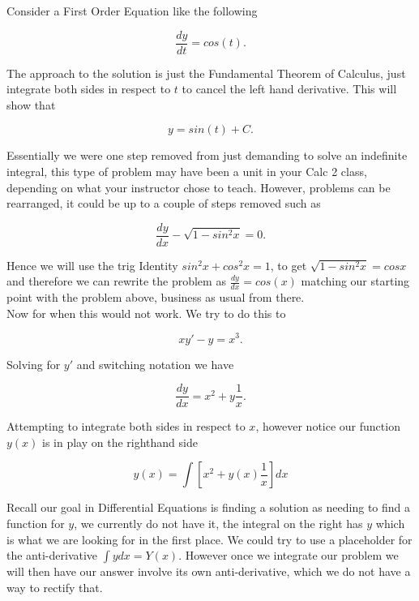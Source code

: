\documentclass[12pt]{article}
\begin{document}
Consider a First Order Equation like the following

\begin{equation*}
    \frac{dy}{dt} = cos(t).
\end{equation*}

The approach to the solution is just the Fundamental Theorem of Calculus, just integrate both sides in respect to $t$ to cancel the left hand derivative. This will show that

\begin{equation*}
    y = sin(t) + C.
\end{equation*}

Essentially we were one step removed from just demanding to solve an indefinite integral, this type of problem may have been a unit in your Calc 2 class, depending on what your instructor chose to teach. However, problems can be rearranged, it could be up to a couple of steps removed such as

\begin{equation*}
    \frac{dy}{dx} - \sqrt{1-sin^2{x}} = 0.
\end{equation*}

Hence we will use the trig Identity $sin^2{x}+cos^2{x}=1$, to get $\sqrt{1-sin^2{x}} = cos{x}$ and therefore we can rewrite the problem as $\frac{dy}{dx} = cos(x)$ matching our starting point with the problem above, business as usual from there. \\

Now for when this would not work. We try to do this to

\begin{equation*}
    xy'-y = x^3.
\end{equation*}

Solving for $y'$ and switching notation we have

\begin{equation*}
    \frac{dy}{dx}= x^2+y\frac{1}{x}.
\end{equation*}

Attempting to integrate both sides in respect to $x$, however notice our function $y(x)$ is in play on the righthand side

\begin{equation*}
    y(x) = \int \left[x^2+y(x)\frac{1}{x}\right] dx
\end{equation*}

Recall our goal in Differential Equations is finding a solution as needing to find a function for $y$, we currently do not have it, the integral on the right has $y$ which is what we are looking for in the first place. We could try to use a placeholder for the anti-derivative $\int y dx= Y(x)$. However once we integrate our problem we will then have our answer involve its own anti-derivative, which we do not have a way to rectify that. \\
\end{document}
